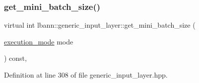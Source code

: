 \subsubsection{\texorpdfstring{get\+\_\+mini\+\_\+batch\+\_\+size()}{get\_mini\_batch\_size()}}
{\footnotesize\ttfamily virtual int lbann\+::generic\+\_\+input\+\_\+layer\+::get\+\_\+mini\+\_\+batch\+\_\+size (\begin{DoxyParamCaption}\item[{\hyperlink{base_8hpp_a2781a159088df64ed7d47cc91c4dc0a8}{execution\+\_\+mode}}]{mode }\end{DoxyParamCaption}) const\hspace{0.3cm}{\ttfamily [inline]}, {\ttfamily [virtual]}}



Definition at line 308 of file generic\+\_\+input\+\_\+layer.\+hpp.


